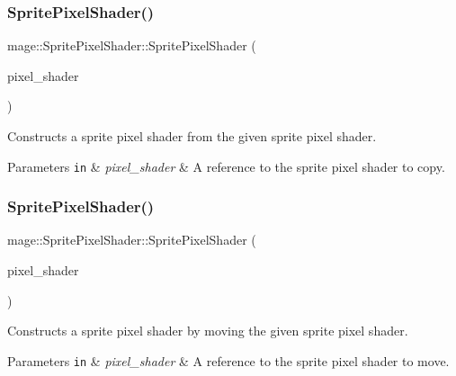 \subsubsection{\texorpdfstring{Sprite\+Pixel\+Shader()}{SpritePixelShader()}\hspace{0.1cm}{\footnotesize\ttfamily [5/6]}}
{\footnotesize\ttfamily mage\+::\+Sprite\+Pixel\+Shader\+::\+Sprite\+Pixel\+Shader (\begin{DoxyParamCaption}\item[{const \hyperlink{classmage_1_1_sprite_pixel_shader}{Sprite\+Pixel\+Shader} \&}]{pixel\+\_\+shader }\end{DoxyParamCaption})\hspace{0.3cm}{\ttfamily [delete]}}

Constructs a sprite pixel shader from the given sprite pixel shader.


\begin{DoxyParams}[1]{Parameters}
\mbox{\tt in}  & {\em pixel\+\_\+shader} & A reference to the sprite pixel shader to copy. \\
\hline
\end{DoxyParams}
\hypertarget{classmage_1_1_sprite_pixel_shader_a1507191b6574cc1fb499b4995f73edfe}{}\label{classmage_1_1_sprite_pixel_shader_a1507191b6574cc1fb499b4995f73edfe} 
\subsubsection{\texorpdfstring{Sprite\+Pixel\+Shader()}{SpritePixelShader()}\hspace{0.1cm}{\footnotesize\ttfamily [6/6]}}
{\footnotesize\ttfamily mage\+::\+Sprite\+Pixel\+Shader\+::\+Sprite\+Pixel\+Shader (\begin{DoxyParamCaption}\item[{\hyperlink{classmage_1_1_sprite_pixel_shader}{Sprite\+Pixel\+Shader} \&\&}]{pixel\+\_\+shader }\end{DoxyParamCaption})\hspace{0.3cm}{\ttfamily [default]}}

Constructs a sprite pixel shader by moving the given sprite pixel shader.


\begin{DoxyParams}[1]{Parameters}
\mbox{\tt in}  & {\em pixel\+\_\+shader} & A reference to the sprite pixel shader to move. \\
\hline
\end{DoxyParams}
\hypertarget{classmage_1_1_sprite_pixel_shader_a0e2a3f2b52417ebffc56db3739bdd0c2}{}\label{classmage_1_1_sprite_pixel_shader_a0e2a3f2b52417ebffc56db3739bdd0c2} 
